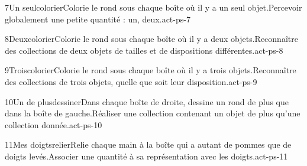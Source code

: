 \begin{activite}{7}{Un seul}{colorier}{Colorie le rond sous chaque boîte où il y a {\otBold\color{otNavy}un seul} objet.}{Percevoir globalement une petite quantité : un, deux.}{act-ps-7}
\end{activite}
\begin{activite}{8}{Deux}{colorier}{Colorie le rond sous chaque boîte où il y a {\otBold\color{otNavy}deux} objets.}{Reconnaître des collections de deux objets de tailles et de dispositions différentes.}{act-ps-8}
\end{activite}
\begin{activite}{9}{Trois}{colorier}{Colorie le rond sous chaque boîte où il y a {\otBold\color{otNavy}trois} objets.}{Reconnaître des collections de trois objets, quelle que soit leur disposition.}{act-ps-9}
\end{activite}
\begin{activite}{10}{Un de plus}{dessiner}{Dans chaque boîte de droite, dessine {\otBold\color{otNavy}un rond de plus} que dans la boîte de gauche.}{Réaliser une collection contenant un objet de plus qu’une collection donnée.}{act-ps-10}
\end{activite}
\begin{activite}{11}{Mes doigts}{relier}{Relie chaque main à la boîte qui a {\otBold\color{otNavy}autant} de pommes que de doigts levés.}{Associer une quantité à sa représentation avec les doigts.}{act-ps-11}
\end{activite}
